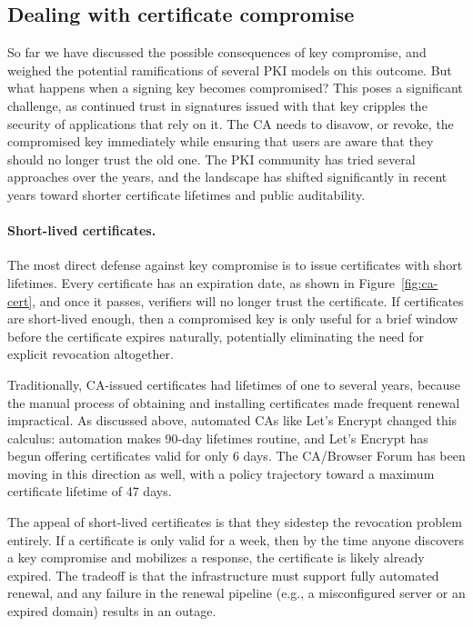 \documentclass[11pt]{article}
\begin{document}
\subsection{Dealing with certificate compromise}

So far we have discussed the possible consequences of key compromise,
and weighed the potential ramifications of several PKI models on this
outcome. But what happens when a signing key becomes compromised? This
poses a significant challenge, as continued trust in signatures issued
with that key cripples the security of applications that rely on it.
The CA needs to disavow, or revoke, the compromised key
immediately while ensuring that users are aware that they should no
longer trust the old one. The PKI community has tried several
approaches over the years, and the landscape has shifted
significantly in recent years toward shorter certificate lifetimes and
public auditability.

\paragraph{Short-lived certificates.}
The most direct defense against key compromise is to issue certificates
with short lifetimes. Every certificate has an expiration date, as shown
in Figure~\ref{fig:ca-cert}, and once it passes, verifiers will no longer
trust the certificate. If certificates are short-lived enough, then a
compromised key is only useful for a brief window before the certificate
expires naturally, potentially eliminating the need for explicit
revocation altogether.

Traditionally, CA-issued certificates had lifetimes of one to several
years, because the manual process of obtaining and installing certificates
made frequent renewal impractical. As discussed above, automated CAs
like Let's Encrypt changed this calculus: automation makes 90-day lifetimes
routine, and Let's Encrypt has begun offering certificates valid for only
6 days. The CA/Browser Forum has been moving in this direction as well,
with a policy trajectory toward a maximum certificate lifetime of 47 days.

The appeal of short-lived certificates is that they sidestep the revocation
problem entirely. If a certificate is only valid for a week, then by the
time anyone discovers a key compromise and mobilizes a response, the
certificate is likely already expired. The tradeoff is that the
infrastructure must support fully automated renewal, and any failure in
the renewal pipeline (e.g., a misconfigured server or an expired domain)
results in an outage.
\end{document}
